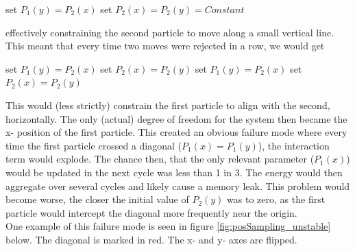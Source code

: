 \documentclass[11pt,a4paper,titlepage]{article}
\begin{document}
\begin{algorithm}[H]
\SetAlgoLined
set $P_1(y) = P_2(x)$\;
set $P_2(x) = P_2(y) = Constant$\;
\end{algorithm}
effectively constraining the second particle to move along a small vertical line.
This meant that every time two moves were rejected in a row, we would get

\begin{algorithm}[H]
\SetAlgoLined
{}
set $P_1(y) = P_2(x)$\;
set $P_2(x) = P_2(y)$\;
set $P_1(y) = P_2(x)$\;
set $P_2(x) = P_2(y)$\;
\end{algorithm}
This would (less strictly) constrain the first particle to align with the second, horizontally. The only (actual) degree of freedom for the system then became the x- position of the first particle. This created an obvious failure mode where every time the first particle crossed a diagonal ($P_1(x) = P_1(y)$), the interaction term would explode. The chance then, that the only relevant parameter ($P_1(x)$) would be updated in the next cycle was less than 1 in 3. The energy would then aggregate over several cycles and likely cause a memory leak. This problem would become worse, the closer the initial value of $P_2(y)$ was to zero, as the first particle would intercept the diagonal more frequently near the origin.\\One example of this failure mode is seen in figure \ref{fig:posSampling_unstable} below. The diagonal is marked in red. The x- and y- axes are flipped.
\end{document}

